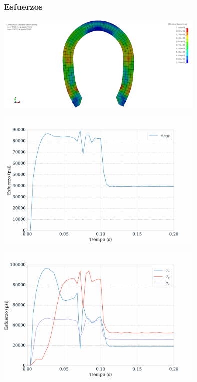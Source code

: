 \subsubsection{Esfuerzos}

\begin{center}
\includegraphics[width=0.75\textwidth]{src/ch4/von_mises_01.png}
\label{fig:von_mises_01}
\end{center}

\begin{center}
\includegraphics[width=0.75\textwidth]{src/ch4/von_mises_stress_01.pdf}
\label{fig:von_mises_stress_01}
\end{center}

\begin{center}
\includegraphics[width=0.75\textwidth]{src/ch4/xyz_stress_01.pdf}
\label{fig:xyz_stress_01}
\end{center}

